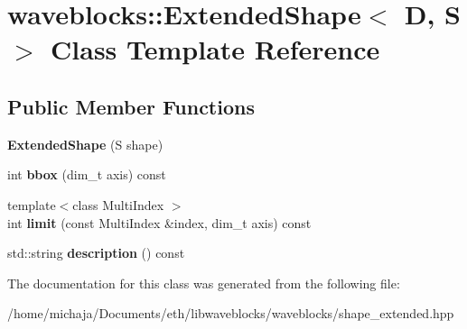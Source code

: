 \hypertarget{classwaveblocks_1_1_extended_shape}{}\section{waveblocks\+:\+:Extended\+Shape$<$ D, S $>$ Class Template Reference}
\label{classwaveblocks_1_1_extended_shape}
\subsection*{Public Member Functions}
\begin{DoxyCompactItemize}
\item 
\hypertarget{classwaveblocks_1_1_extended_shape_a6ad7be5029d1bfc38a0a1d896a750fd8}{}{\bfseries Extended\+Shape} (S shape)\label{classwaveblocks_1_1_extended_shape_a6ad7be5029d1bfc38a0a1d896a750fd8}

\item 
\hypertarget{classwaveblocks_1_1_extended_shape_a57ce726fd86c72f83a599ad9d9cd9386}{}int {\bfseries bbox} (dim\+\_\+t axis) const \label{classwaveblocks_1_1_extended_shape_a57ce726fd86c72f83a599ad9d9cd9386}

\item 
\hypertarget{classwaveblocks_1_1_extended_shape_a3173c2e80bccb101e23006c9697e2e51}{}{\footnotesize template$<$class Multi\+Index $>$ }\\int {\bfseries limit} (const Multi\+Index \&index, dim\+\_\+t axis) const \label{classwaveblocks_1_1_extended_shape_a3173c2e80bccb101e23006c9697e2e51}

\item 
\hypertarget{classwaveblocks_1_1_extended_shape_ae7de867b655d28453405533f90824a9e}{}std\+::string {\bfseries description} () const \label{classwaveblocks_1_1_extended_shape_ae7de867b655d28453405533f90824a9e}

\end{DoxyCompactItemize}


The documentation for this class was generated from the following file\+:\begin{DoxyCompactItemize}
\item 
/home/michaja/\+Documents/eth/libwaveblocks/waveblocks/shape\+\_\+extended.\+hpp\end{DoxyCompactItemize}
